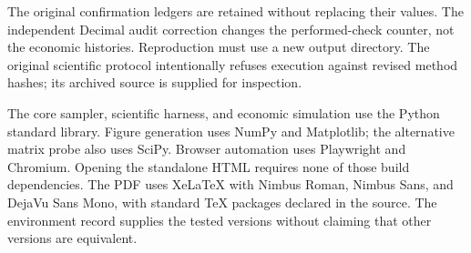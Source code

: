 The original confirmation ledgers are retained without replacing their values.
The independent Decimal audit correction changes the performed-check counter,
not the economic histories. Reproduction must use a new output directory.
The original scientific protocol intentionally refuses execution against revised
method hashes; its archived source is supplied for inspection.

The core sampler, scientific harness, and economic simulation use the Python
standard library. Figure generation uses NumPy and Matplotlib; the alternative
matrix probe also uses SciPy. Browser automation uses Playwright and Chromium.
Opening the standalone HTML requires none of those build dependencies. The PDF
uses XeLaTeX with Nimbus Roman, Nimbus Sans, and DejaVu Sans Mono, with standard
TeX packages declared in the source. The environment record supplies the tested
versions without claiming that other versions are equivalent.
